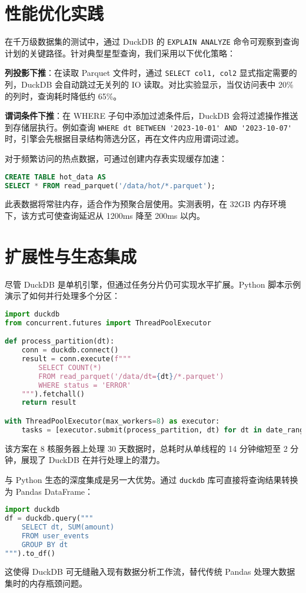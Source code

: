 \chapter{性能优化实践}
在千万级数据集的测试中，通过 DuckDB 的 \verb!EXPLAIN ANALYZE! 命令可观察到查询计划的关键路径。针对典型星型查询，我们采用以下优化策略：\par
\textbf{列投影下推}：在读取 Parquet 文件时，通过 \verb!SELECT col1, col2! 显式指定需要的列，DuckDB 会自动跳过无关列的 IO 读取。对比实验显示，当仅访问表中 20\%{} 的列时，查询耗时降低约 65\%{}。\par
\textbf{谓词条件下推}：在 WHERE 子句中添加过滤条件后，DuckDB 会将过滤操作推送到存储层执行。例如查询 \verb!WHERE dt BETWEEN '2023-10-01' AND '2023-10-07'! 时，引擎会先根据目录结构筛选分区，再在文件内应用谓词过滤。\par
对于频繁访问的热点数据，可通过创建内存表实现缓存加速：\par
\begin{lstlisting}[language=sql]
CREATE TABLE hot_data AS 
SELECT * FROM read_parquet('/data/hot/*.parquet');
\end{lstlisting}
此表数据将常驻内存，适合作为预聚合层使用。实测表明，在 32GB 内存环境下，该方式可使查询延迟从 1200ms 降至 200ms 以内。\par
\chapter{扩展性与生态集成}
尽管 DuckDB 是单机引擎，但通过任务分片仍可实现水平扩展。Python 脚本示例演示了如何并行处理多个分区：\par
\begin{lstlisting}[language=python]
import duckdb
from concurrent.futures import ThreadPoolExecutor

def process_partition(dt):
    conn = duckdb.connect()
    result = conn.execute(f"""
        SELECT COUNT(*) 
        FROM read_parquet('/data/dt={dt}/*.parquet')
        WHERE status = 'ERROR'
    """).fetchall()
    return result

with ThreadPoolExecutor(max_workers=8) as executor:
    tasks = [executor.submit(process_partition, dt) for dt in date_range]
\end{lstlisting}
该方案在 8 核服务器上处理 30 天数据时，总耗时从单线程的 14 分钟缩短至 2 分钟，展现了 DuckDB 在并行处理上的潜力。\par
与 Python 生态的深度集成是另一大优势。通过 \verb!duckdb! 库可直接将查询结果转换为 Pandas DataFrame：\par
\begin{lstlisting}[language=python]
import duckdb
df = duckdb.query("""
    SELECT dt, SUM(amount) 
    FROM user_events 
    GROUP BY dt
""").to_df()
\end{lstlisting}
这使得 DuckDB 可无缝融入现有数据分析工作流，替代传统 Pandas 处理大数据集时的内存瓶颈问题。\par
